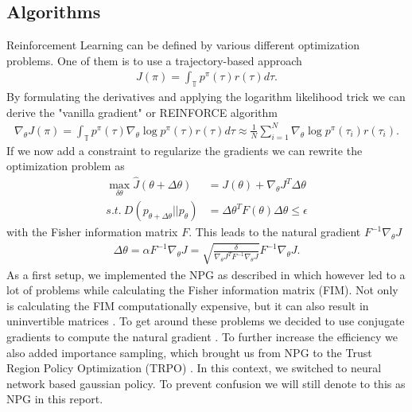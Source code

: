 \subsection{Algorithms}
\label{algos}
Reinforcement Learning can be defined by various different optimization problems. One of them is to use a trajectory-based approach
\begin{align}
  J(\pi) = \int_{\mathbb{T}} p^{\pi}(\tau) r(\tau) d\tau.
\end{align}
By formulating the derivatives and applying the logarithm likelihood trick we can derive the "vanilla gradient" or REINFORCE algorithm \cite{Williams1992}
\begin{align}
  \nabla_{\theta} J(\pi) = \int_{\mathbb{T}} p^{\pi}(\tau) \nabla_{\theta} \log p^{\pi}(\tau) r(\tau) d\tau \approx \frac{1}{N} \sum_{i=1}^{N} \nabla_{\theta} \log p^{\pi}(\tau_i) r(\tau_i).
\end{align}
If we now add a constraint to regularize the gradients we can rewrite the optimization problem as
\begin{align}
  \max_{\delta\theta} \hat J(\theta + \Delta\theta) &= J(\theta) + \nabla_{\theta} J^T \Delta\theta \nonumber \\
  s.t. \ D(p_{\theta + \Delta\theta} || p_{\theta}) &= \Delta\theta^T F(\theta) \Delta\theta \leq \epsilon \label{NpgOpti}
\end{align}
with the Fisher information matrix $F$. This leads to the natural gradient $F^{-1} \nabla_{\theta} J$ \cite{Rajeswaran2017}
\begin{align}
  \Delta \theta = \alpha F^{-1} \nabla_{\theta} J = \sqrt{\frac{\delta}{\nabla_{\theta} J^T F^{-1} \nabla_{\theta} J}} F^{-1} \nabla_{\theta} J.
\end{align}
As a first setup, we implemented the NPG as described in \cite{Rajeswaran2017} which however led to a lot of problems while calculating the Fisher information matrix (FIM). Not only is calculating the FIM computationally expensive, but it can also result in uninvertible matrices \cite{DuanCHSA16}. To get around these problems we decided to use conjugate gradients to compute the natural gradient \cite{DuanCHSA16}. To further increase the efficiency we also added importance sampling, which brought us from NPG to the Trust Region Policy Optimization (TRPO) \cite{SchulmanLMJA15,Telesens}. In this context, we switched to neural network based gaussian policy. To prevent confusion we will still denote to this as NPG in this report.\\

